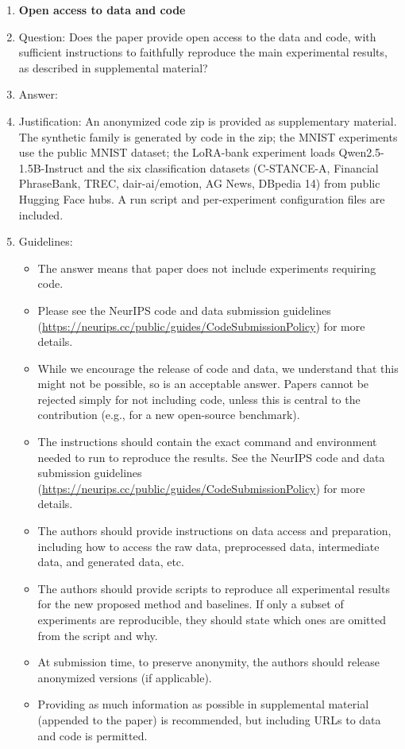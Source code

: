 \begin{enumerate}
\item {\bf Open access to data and code}
    \item[] Question: Does the paper provide open access to the data and code, with sufficient instructions to faithfully reproduce the main experimental results, as described in supplemental material?
    \item[] Answer: \answerYes{}
    \item[] Justification: An anonymized code zip is provided as supplementary material. The synthetic family is generated by code in the zip; the MNIST experiments use the public MNIST dataset; the LoRA-bank experiment loads Qwen2.5-1.5B-Instruct and the six classification datasets (C-STANCE-A, Financial PhraseBank, TREC, dair-ai/emotion, AG News, DBpedia 14) from public Hugging Face hubs. A run script and per-experiment configuration files are included.
    \item[] Guidelines:
    \begin{itemize}
        \item The answer \answerNA{} means that paper does not include experiments requiring code.
        \item Please see the NeurIPS code and data submission guidelines (\url{https://neurips.cc/public/guides/CodeSubmissionPolicy}) for more details.
        \item While we encourage the release of code and data, we understand that this might not be possible, so \answerNo{} is an acceptable answer. Papers cannot be rejected simply for not including code, unless this is central to the contribution (e.g., for a new open-source benchmark).
        \item The instructions should contain the exact command and environment needed to run to reproduce the results. See the NeurIPS code and data submission guidelines (\url{https://neurips.cc/public/guides/CodeSubmissionPolicy}) for more details.
        \item The authors should provide instructions on data access and preparation, including how to access the raw data, preprocessed data, intermediate data, and generated data, etc.
        \item The authors should provide scripts to reproduce all experimental results for the new proposed method and baselines. If only a subset of experiments are reproducible, they should state which ones are omitted from the script and why.
        \item At submission time, to preserve anonymity, the authors should release anonymized versions (if applicable).
        \item Providing as much information as possible in supplemental material (appended to the paper) is recommended, but including URLs to data and code is permitted.
    \end{itemize}



\end{enumerate}
